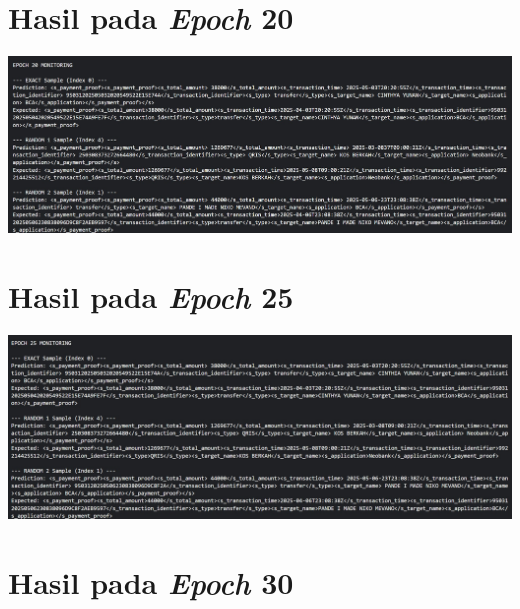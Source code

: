 \section{Hasil pada \emph{Epoch} 20}
\includegraphics[width=1\textwidth]{images/epoch/epoch-20.jpg}

\section{Hasil pada \emph{Epoch} 25}
\includegraphics[width=1\textwidth]{images/epoch/epoch-25.jpg}

\section{Hasil pada \emph{Epoch} 30}
